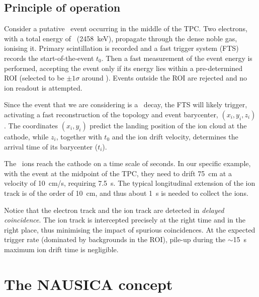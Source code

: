 \documentclass[pdflatex,iicol,sn-mathphys-num]{sn-jnl}
\begin{document}
\subsection{Principle of operation}
\label{sec:pof}

Consider a putative \bbonu\ event occurring in the middle of the TPC. Two electrons, with a total energy of \Qbb\ (\SI{2458}{keV}), propagate through the dense noble gas, ionising it. Primary scintillation is recorded and a fast trigger system (FTS) records the start-of-the-event $t_0$. Then a fast measurement of the event energy is performed, accepting the event only if its energy lies within a pre-determined ROI (selected to be $\pm 1\sigma$ around \Qbb). Events outside the ROI are rejected and no ion readout is attempted.

Since the event that we are considering is a \bbonu\ decay, the FTS will likely trigger, activating a fast reconstruction of the topology and event barycenter, $(x_i, y_i, z_i)$. The coordinates $(x_i,y_i)$ predict the landing position of the ion cloud at the cathode, while $z_i$, together with $t_0$ and the ion drift velocity, determines the arrival time of its barycenter ($t_i$). 

     
The \xetp\ ions reach the cathode on a time scale of seconds. In our specific example, with the event at the midpoint of the TPC, they need to drift \SI{75}{cm} at a velocity of \SI{10}{cm/s}, requiring \SI{7.5}{s}. 
The typical longitudinal extension of the ion track is of the order of \SI{10}{cm}, and thus about \SI{1}{s} is needed to collect the ions. 

Notice that the electron track and the ion track are detected in \emph{delayed coincidence}. The ion track is intercepted precisely at the right time and in the right place, thus minimising the impact of spurious coincidences. At the expected trigger rate (dominated by backgrounds in the ROI), pile-up during the $\sim$\SI{15}{s} maximum ion drift time is negligible.


\section{The NAUSICA concept}
\label{sec:nausica}
\end{document}

